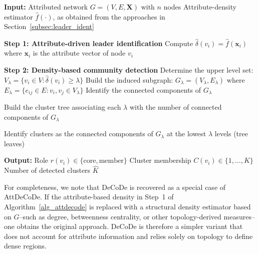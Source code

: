 \documentclass[11pt]{article}
\begin{document}
\begin{footnotesize}
\begin{algorithm}[b!]
\caption{AttDeCoDe}
\begin{algorithmic}[1]

\State \textbf{Input:} 
\Statex \quad Attributed network $G = (V,E,\bm{X})$ with $n$ nodes
\Statex \quad Attribute-density estimator $\hat{f}(\cdot)$, as obtained from the approaches in Section~\ref{subsec:leader_ident}

\vspace{0.2cm}
\State \textbf{Step 1: Attribute-driven leader identification}
\State Compute $\hat\delta(v_i) = \hat{f}(\bm{x}_i)$ where $\bm{x}_i$ is the attribute vector of node $v_i$

\vspace{0.2cm}
\State \textbf{Step 2: Density-based community detection}
    \State Determine the upper level set:
    \STATEx \quad $V_{\lambda} = \{ v_i \in V : \hat\delta(v_i) \geq \lambda \}$
    \State Build the induced subgraph:
    \STATEx \quad $G_{\lambda} = (V_{\lambda}, E_{\lambda})$ where $E_{\lambda} = \{ e_{ij} \in E : v_i, v_j \in V_{\lambda} \}$
    \State Identify the connected components of $G_{\lambda}$
\ENDFOR

\vspace{0.2cm}
\State Build the cluster tree associating each $\lambda$ with the number of connected components of $G_{\lambda}$

\vspace{0.2cm}
\State Identify clusters as the connected components of $G_{\lambda}$ at the lowest $\lambda$ levels (tree leaves)

\vspace{0.2cm}
\State \textbf{Output:}
\Statex \quad Role $r(v_i) \in \{\text{core}, \text{member}\}$
\Statex \quad Cluster membership $C(v_i)  \in \{1, \ldots, K\}$
\Statex \quad Number of detected clusters $\hat K$

\end{algorithmic}
\label{alg_attdecode}
\end{algorithm}
\end{footnotesize}

For completeness, we note that DeCoDe is recovered as a special case of AttDeCoDe. If the attribute-based density in Step~1 of Algorithm~\ref{alg_attdecode} is replaced with a structural density estimator based on $G$--such as degree, 
betweenness centrality, or other topology-derived measures--one obtains the original approach. DeCoDe is therefore a simpler variant that does not account for attribute information and relies solely on topology to define dense regions.
\end{document}
